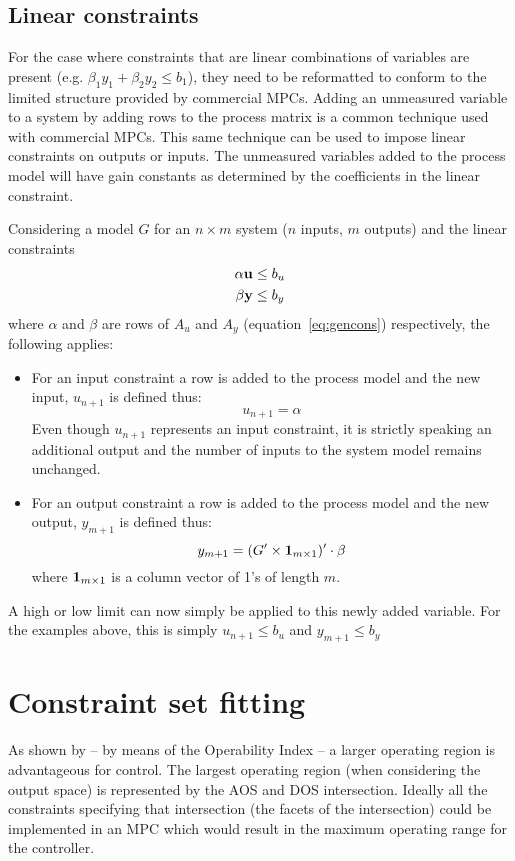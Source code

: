\subsection{Linear constraints}\label{sec:lincons}
For the case where constraints that are linear combinations of variables are present (e.g. $\beta_1 y_1+\beta_2 y_2\leq b_1$), they need to be reformatted to conform to the limited structure provided by commercial MPCs.
Adding an unmeasured variable to a system by adding rows to the process matrix is a common technique used with commercial MPCs.
This same technique can be used to impose linear constraints  on outputs or inputs.
The unmeasured variables added to the process model will have gain constants as determined by the coefficients in the linear constraint.

Considering a model $G$ for an $n\times m$ system ($n$ inputs, $m$ outputs) and the linear constraints 
\begin{align}
  \alpha {\bf {u}} &\leq b_u\notag\\ 
  \beta {\bf {y}} &\leq b_y \notag   
\end{align}
where $\alpha$ and $\beta$ are rows of $A_u$ and $A_y$ (equation~\ref{eq:gencons}) respectively, the following applies:
\begin{itemize}
\item For an input constraint a row is added to the process model and the new input, $u_{n+1}$ is defined thus:
\begin{equation}
  \label{eq:linconinput}
   u_{n+1} = \alpha
\end{equation}
Even though $u_{n+1}$ represents an input constraint, it is strictly speaking an additional output and the number of inputs to the system model remains unchanged. 
\item For an output constraint a row is added to the process model and the new output, $y_{m+1}$ is defined thus:
\begin{equation}
  \label{eq:linconoutput}
   y_{m+1} = (G'\times{\bf {1}}_{m\times 1})'\cdot\beta
\end{equation}
where ${\bf {1}}_{m\times 1}$ is a column vector of 1's of length $m$.
\end{itemize}
A high or low limit can now simply be applied to this newly added variable.
For the examples above, this is simply $u_{n+1}\leq b_u$ and $y_{m+1}\leq b_y$


\section{Constraint set fitting}
As shown by \citet{vinsonphd} -- by means of the Operability Index -- a larger operating region is advantageous for control.
The largest operating region (when considering the output space) is represented by the AOS and DOS intersection.
Ideally all the constraints specifying that intersection (the facets of the intersection) could be implemented in an MPC which would result in the maximum operating range for the controller.

